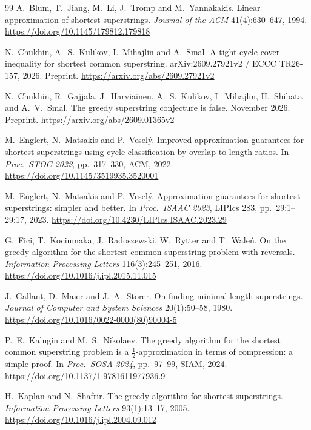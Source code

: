 \documentclass[11pt,a4paper]{article}   %
\theoremstyle{compact}
\theoremstyle{compactdef}
\begin{document}
\newpage
{\small
\begin{thebibliography}{99}\setlength{\itemsep}{0pt}
 A.~Blum, T.~Jiang, M.~Li, J.~Tromp and M.~Yannakakis.
  Linear approximation of shortest superstrings.
  \emph{Journal of the ACM} 41(4):630--647, 1994.
  \url{https://doi.org/10.1145/179812.179818}

 N.~Chukhin, A.~S.~Kulikov, I.~Mihajlin and A.~Smal.
  A tight cycle-cover inequality for shortest common superstring.
  arXiv:2609.27921v2 / ECCC TR26-157, 2026. Preprint.
  \url{https://arxiv.org/abs/2609.27921v2}

 N.~Chukhin, R.~Gajjala, J.~Harviainen, A.~S.~Kulikov,
  I.~Mihajlin, H.~Shibata and A.~V.~Smal.
  The greedy superstring conjecture is false.
  November 2026. Preprint.
  \url{https://arxiv.org/abs/2609.01365v2}

 M.~Englert, N.~Matsakis and P.~Vesel\'y.
  Improved approximation guarantees for shortest superstrings using cycle
  classification by overlap to length ratios.
  In \emph{Proc.\ STOC 2022}, pp.~317--330, ACM, 2022.
  \url{https://doi.org/10.1145/3519935.3520001}

 M.~Englert, N.~Matsakis and P.~Vesel\'y.
  Approximation guarantees for shortest superstrings: simpler and better.
  In \emph{Proc.\ ISAAC 2023}, LIPIcs 283, pp.~29:1--29:17, 2023.
  \url{https://doi.org/10.4230/LIPIcs.ISAAC.2023.29}

 G.~Fici, T.~Kociumaka, J.~Radoszewski, W.~Rytter and
  T.~Wale\'n. On the greedy algorithm for the shortest common superstring
  problem with reversals. \emph{Information Processing Letters}
  116(3):245--251, 2016.
  \url{https://doi.org/10.1016/j.ipl.2015.11.015}

 J.~Gallant, D.~Maier and J.~A.~Storer.
  On finding minimal length superstrings.
  \emph{Journal of Computer and System Sciences} 20(1):50--58, 1980.
  \url{https://doi.org/10.1016/0022-0000(80)90004-5}

 P.~E.~Kalugin and M.~S.~Nikolaev.
  The greedy algorithm for the shortest common superstring problem is a
  $\tfrac12$-approximation in terms of compression: a simple proof.
  In \emph{Proc.\ SOSA 2024}, pp.~97--99, SIAM, 2024.
  \url{https://doi.org/10.1137/1.9781611977936.9}

 H.~Kaplan and N.~Shafrir.
  The greedy algorithm for shortest superstrings.
  \emph{Information Processing Letters} 93(1):13--17, 2005.
  \url{https://doi.org/10.1016/j.ipl.2004.09.012}


\end{thebibliography}}
\end{document}

